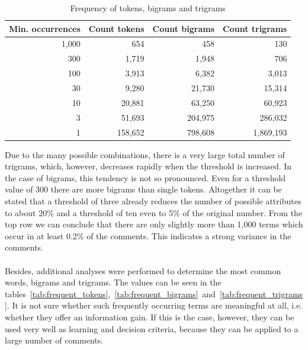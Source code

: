 \documentclass[article,type=msc,colorback,accentcolor=tud7b]{tudthesis}
\begin{document}
	\begin{table}[H]
	  \begin{tabular}{ | r | r | r | r | }
		\hline
		Min. occurrences & Count tokens & Count bigrams & Count trigrams \\ \hline
		1,000 & 654 & 458 & 130 \\ \hline
		300 & 1,719 & 1,948 & 706 \\ \hline
		100 & 3,913 & 6,382 & 3,013 \\ \hline
		30 & 9,280 & 21,730 & 15,314 \\ \hline
		10 & 20,881 & 63,250 & 60,923 \\ \hline
		3 & 51,693 & 204,975 & 286,032 \\ \hline
		1 & 158,652 & 798,608 & 1,869,193 \\ \hline
	  \end{tabular}
      \caption{Frequency of tokens, bigrams and trigrams}
      \label{tab:frequency_tokens_bigrams_trigrams}
	\end{table}
	
    Due to the many possible combinations, there is a very large total number of trigrams, which, however, decreases rapidly when the threshold is increased. In the case of bigrams, this tendency is not so pronounced. Even for a threshold value of 300 there are more bigrams than single tokens. Altogether it can be stated that a threshold of three already reduces the number of possible attributes to about 20\% and a threshold of ten even to 5\% of the original number. From the top row we can conclude that there are only slightly more than 1,000 terms which occur in at least 0.2\% of the comments. This indicates a strong variance in the comments. \\\\
    Besides, additional analyses were performed to determine the most common words, bigrams and trigrams. The values can be seen in the tables~\ref{tab:frequent_tokens},~\ref{tab:frequent_bigrams}~and~\ref{tab:frequent_trigrams}. It is not sure whether such frequently occurring terms are meaningful at all, i.e. whether they offer an information gain. If this is the case, however, they can be used very well as learning and decision criteria, because they can be applied to a large number of comments.
          
\end{document}
